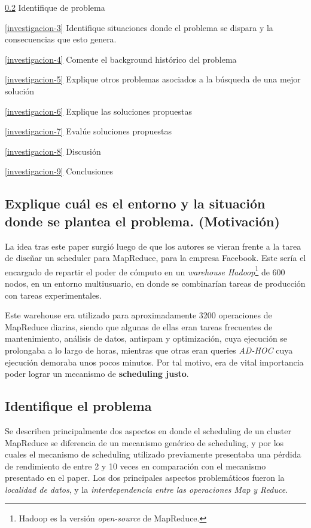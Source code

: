 \documentclass[11pt, a4paper, twoside]{article}
\begin{document}
\ref{investigacion-2} Identifique de problema

\ref{investigacion-3} Identifique situaciones donde el problema se dispara y la consecuencias que esto genera.

\ref{investigacion-4} Comente el background histórico del problema

\ref{investigacion-5} Explique otros problemas asociados a la búsqueda de una mejor solución

\ref{investigacion-6} Explique las soluciones propuestas

\ref{investigacion-7} Evalúe soluciones propuestas

\ref{investigacion-8} Discusión

\ref{investigacion-9} Conclusiones

\clearpage
\subsection {\footnotesize Explique cuál es el entorno y la situación donde se plantea el problema. (Motivación)}
\label{investigacion-1}

La idea tras este paper surgió luego de que los autores se vieran frente a la
tarea de diseñar un scheduler para MapReduce, para la empresa Facebook. Este
sería el encargado de repartir el poder de cómputo en un \emph{warehouse
Hadoop}\footnote{Hadoop es la versión \emph{open-source} de MapReduce.} de 600
nodos, en un entorno multiusuario, en donde se combinarían tareas de producción
con tareas experimentales.

Este warehouse era utilizado para aproximadamente 3200 operaciones de MapReduce
diarias, siendo que algunas de ellas eran tareas frecuentes de mantenimiento,
análisis de datos, antispam y optimización, cuya ejecución se prolongaba a lo
largo de horas, mientras que otras eran queries \emph{AD-HOC} cuya ejecución
demoraba unos pocos minutos. Por tal motivo, era de vital importancia poder
lograr un mecanismo de \textbf{scheduling justo}.

\clearpage
\subsection {\footnotesize Identifique el problema}
\label{investigacion-2}

Se describen principalmente dos aspectos en donde el scheduling de un cluster
MapReduce se diferencia de un mecanismo genérico de scheduling, y por los cuales
el mecanismo de scheduling utilizado previamente presentaba una pérdida de
rendimiento de entre 2 y 10 veces en comparación con el mecanismo presentado en
el paper. Los dos principales aspectos problemáticos fueron la \emph{localidad
de datos}, y la \emph{interdependencia entre las operaciones Map y Reduce}.
\end{document}
